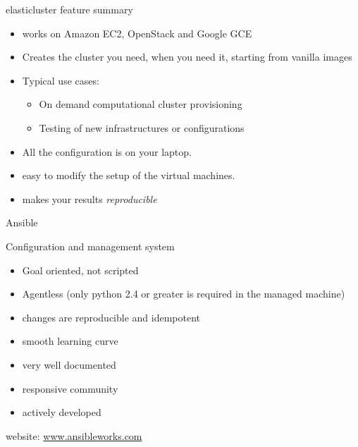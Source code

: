 \documentclass[english,serif,mathserif,usenames,dvipsnames]{beamer}
\begin{document}
\begin{frame}
  {elasticluster feature summary}
  \begin{itemize}
  \item works on Amazon EC2, OpenStack and Google GCE
  \item Creates the cluster you need, when you need it, starting from
    vanilla images
  \item Typical use cases:
    \begin{itemize}
    \item On demand computational cluster provisioning
    \item Testing of new infrastructures or configurations
    \end{itemize}
    
  \item All the configuration is on your laptop.
  \item easy to modify the setup of the virtual machines.
  \item makes your results \textit{reproducible}
  \end{itemize}
\end{frame}

\begin{frame}
  {Ansible}
  
  Configuration and management system
  \begin{itemize}
  \item Goal oriented, not scripted
  \item Agentless (only python 2.4 or greater is required in the
    managed machine)
  \item changes are reproducible and idempotent
  \item smooth learning curve
  \item very well documented
  \item responsive community
  \item actively developed
  \end{itemize}

  \+
  website: \url{www.ansibleworks.com}

\end{frame}

\end{document}
